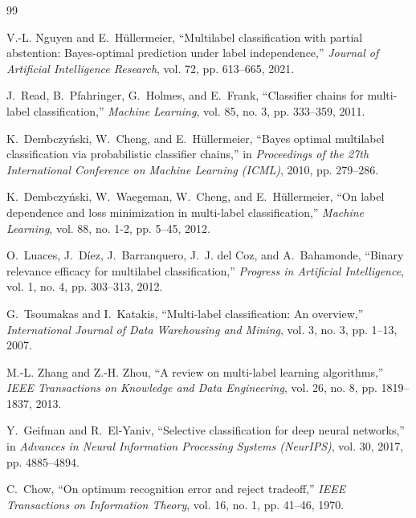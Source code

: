 \documentclass[11pt,a4paper]{article}
\begin{document}
\begin{thebibliography}{99}

V.-L. Nguyen and E.~H\"ullermeier,
\newblock ``Multilabel classification with partial abstention: Bayes-optimal prediction under label independence,''
\newblock \textit{Journal of Artificial Intelligence Research}, vol. 72, pp. 613--665, 2021.

J.~Read, B.~Pfahringer, G.~Holmes, and E.~Frank,
\newblock ``Classifier chains for multi-label classification,''
\newblock \textit{Machine Learning}, vol. 85, no. 3, pp. 333--359, 2011.

K.~Dembczy\'nski, W.~Cheng, and E.~H\"ullermeier,
\newblock ``Bayes optimal multilabel classification via probabilistic classifier chains,''
\newblock in \textit{Proceedings of the 27th International Conference on Machine Learning (ICML)}, 2010, pp. 279--286.

K.~Dembczy\'nski, W.~Waegeman, W.~Cheng, and E.~H\"ullermeier,
\newblock ``On label dependence and loss minimization in multi-label classification,''
\newblock \textit{Machine Learning}, vol. 88, no. 1-2, pp. 5--45, 2012.

O.~Luaces, J.~D{\'i}ez, J.~Barranquero, J.~J. del Coz, and A.~Bahamonde,
\newblock ``Binary relevance efficacy for multilabel classification,''
\newblock \textit{Progress in Artificial Intelligence}, vol. 1, no. 4, pp. 303--313, 2012.

G.~Tsoumakas and I.~Katakis,
\newblock ``Multi-label classification: An overview,''
\newblock \textit{International Journal of Data Warehousing and Mining}, vol. 3, no. 3, pp. 1--13, 2007.

M.-L. Zhang and Z.-H. Zhou,
\newblock ``A review on multi-label learning algorithms,''
\newblock \textit{IEEE Transactions on Knowledge and Data Engineering}, vol. 26, no. 8, pp. 1819--1837, 2013.

Y.~Geifman and R.~El-Yaniv,
\newblock ``Selective classification for deep neural networks,''
\newblock in \textit{Advances in Neural Information Processing Systems (NeurIPS)}, vol. 30, 2017, pp. 4885--4894.

C.~Chow,
\newblock ``On optimum recognition error and reject tradeoff,''
\newblock \textit{IEEE Transactions on Information Theory}, vol. 16, no. 1, pp. 41--46, 1970.


\end{thebibliography}
\end{document}
